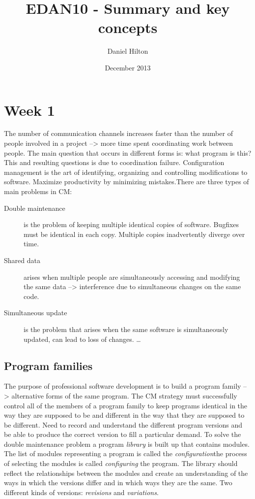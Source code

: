 \usepackage[utf8]{inputenc}

\title{EDAN10 - Summary and key concepts}
\author{Daniel Hilton}
\date{December 2013}

\usepackage{natbib}
\usepackage{graphicx}



\maketitle

\section{Week 1}
The number of communication channels increases faster than the number of people involved in a project -->  more time spent coordinating work between people.
The main question that occurs in different forms is: what program is this? This and resulting questions is due to coordination failure. Configuration management is the art of identifying, organizing and controlling modifications to software. Maximize productivity by minimizing mistakes.There are three types of main problems in CM: \\

\begin{description}
    \item[Double maintenance]
    is the problem of keeping multiple identical copies of software. Bugfixes must be identical in each copy. Multiple copies inadvertently diverge over time.
    \item[Shared data]
    arises when multiple people are simultaneously accessing and modifying the same data --> interference due to simultaneous changes on the same code.
    \item[Simultaneous update] is the problem that arises when the same software is simultaneously updated, can lead to loss of changes. \ldots
\end{description}

\subsection{Program families}
The purpose of professional software development is to build a program family --> alternative forms of the same program. The CM  strategy must successfully control all of the members of a program family to keep programs identical in the way they are supposed to be and different in the way that they are supposed to be different. Need to record and understand the different program versions and be able to produce the correct version to fill a particular demand. To solve the double maintenance problem a program \textit{library} is built up that contains modules. The list of modules representing a program is called the \textit{configuration}the process of selecting the modules is called \textit{configuring} the program.
The library should reflect the relationships between the modules and create an understanding of the ways in which the versions differ and in which ways they are the same. Two different kinds of versions: \textit{revisions} and \textit{variations}.

